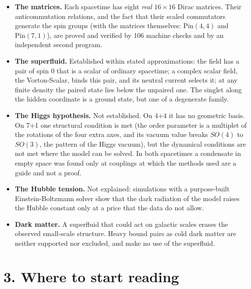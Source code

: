 \documentclass[
  10pt,
]{article}
\providecommand{\tightlist}{%
  \setlength{\itemsep}{0pt}\setlength{\parskip}{0pt}}
\begin{document}
\begin{itemize}
\tightlist
\item
  \textbf{The matrices.} Each spacetime has eight \emph{real}
  \(16\times16\) Dirac matrices. Their anticommutation relations, and
  the fact that their scaled commutators generate the spin groups (with
  the matrices themselves: \(\mathrm{Pin}(4,4)\) and
  \(\mathrm{Pin}(7,1)\)), are proved and verified by 106 machine checks
  and by an independent second program.
\item
  \textbf{The superfluid.} Established within stated approximations: the
  field has a pair of spin 0 that is a scalar of ordinary spacetime; a
  complex scalar field, the Vorton-Scalar, binds this pair, and its
  neutral current selects it; at any finite density the paired state
  lies below the unpaired one. The singlet along the hidden coordinate
  is a ground state, but one of a degenerate family.
\item
  \textbf{The Higgs hypothesis.} Not established. On 4+4 it has no
  geometric basis. On 7+1 one structural condition is met (the order
  parameter is a multiplet of the rotations of the four extra axes, and
  its vacuum value breaks \(SO(4)\) to \(SO(3)\), the pattern of the
  Higgs vacuum), but the dynamical conditions are not met where the
  model can be solved. In both spacetimes a condensate in empty space
  was found only at couplings at which the methods used are a guide and
  not a proof.
\item
  \textbf{The Hubble tension.} Not explained: simulations with a
  purpose-built Einstein-Boltzmann solver show that the dark radiation
  of the model raises the Hubble constant only at a price that the data
  do not allow.
\item
  \textbf{Dark matter.} A superfluid that could act on galactic scales
  erases the observed small-scale structure. Heavy bound pairs as cold
  dark matter are neither supported nor excluded, and make no use of the
  superfluid.
\end{itemize}

\hypertarget{where-to-start-reading}{%
\section{3. Where to start reading}\label{where-to-start-reading}}
\end{document}
